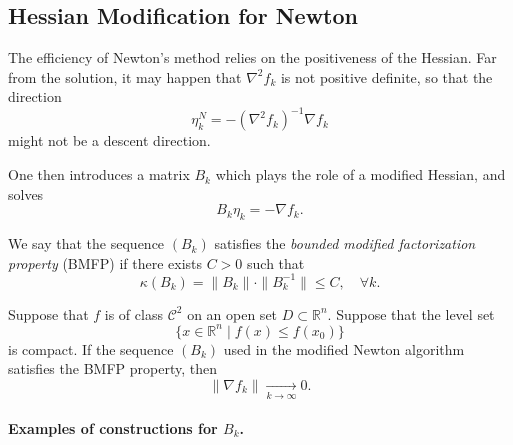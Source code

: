 \subsection{Hessian Modification for Newton}
\label{subsec:2.4.6}

The efficiency of Newton's method relies on the positiveness of the Hessian.
Far from the solution, it may happen that $\nabla^2 f_k$ is not positive definite,
so that the direction
\[
    \eta_k^N = -(\nabla^2 f_k)^{-1}\nabla f_k
\]
might not be a descent direction.

One then introduces a matrix $B_k$ which plays the role of a modified Hessian,
and solves
\[
    B_k \eta_k = -\nabla f_k.
\]

\begin{algorithm}[H]
\caption{Newton with line search and modified Hessian}
\label{alg:newton-modified}
\end{algorithm}

\begin{definition}
We say that the sequence $(B_k)$ satisfies the \emph{bounded modified
factorization property} (BMFP) if there exists $C>0$ such that
\[
    \kappa(B_k)
    = \|B_k\|\cdot\|B_k^{-1}\| \le C,
    \quad \forall k.
\]
\end{definition}

\begin{theoreme}
\label{thm:More-Sorensen}
Suppose that $f$ is of class $\mathcal{C}^2$ on an open set $D\subset\mathbb{R}^n$.
Suppose that the level set
\[
    \{ x \in \mathbb{R}^n \;|\; f(x) \le f(x_0)\}
\]
is compact. If the sequence $(B_k)$ used in the modified Newton algorithm
satisfies the BMFP property, then
\[
    \|\nabla f_k\| \xrightarrow[k\to\infty]{} 0.
\]
\end{theoreme}

\paragraph{Examples of constructions for $B_k$.}

